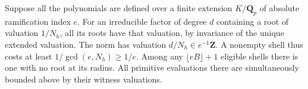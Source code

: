 \noindent
Suppose all the polynomials are defined over a finite extension
$K/\mathbf Q_p$ of absolute ramification index $e$. For an irreducible
factor of degree $d$ containing a root of valuation $1/N_h$, all its roots
have that valuation, by invariance of the unique extended valuation.
The norm has valuation $d/N_h\in e^{-1}\mathbf Z$. A nonempty shell thus
costs at least $1/\gcd(e,N_h)\ge1/e$. Among any $\lfloor eB\rfloor+1$
eligible shells there is one with no root at its radius. All primitive
evaluations there are simultaneously bounded above by their witness
valuations. 
